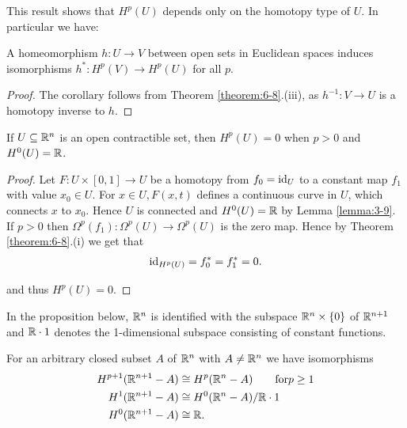 This result shows that $H^p(U)$ depends only on the homotopy type of $U$. In
particular we have:

\begin{corollary}\label{corollary:6-9}
A homeomorphism $h:U\to V$ between open sets in Euclidean spaces induces isomorphisms $h^*:H^p(V)\to H^p(U)$ for
all $p$.
\end{corollary}

\begin{proof}
  The corollary follows from Theorem \ref{theorem:6-8}.(iii), as $h^{-1}:V\to U$ is a
homotopy inverse to $h$.
\end{proof}

\begin{corollary}\label{corollary:6-10}
If $U\subseteq {\ensuremath{\mathbb{R}}}^n$ is an open contractible set, then $H^p(U) = 0$ when
$p > 0$ and $H^0(U) = {\mathbb{R}}$.
\end{corollary}


\begin{proof}
Let $F:U\times[0, 1]\to U$ be a homotopy from $f_0 =\operatorname{id}_U$ to a constant map
$f_1$ with value $x_0\in U$. For $x\in U, F(x, t)$ defines a continuous curve in $U$,
which connects $x$ to $x_0$. Hence $U$ is connected and $H^0(U) = {\mathbb{R}}$ by Lemma \ref{lemma:3-9}.
If $p > 0$ then $\Omega^p(f_1):\Omega^p(U)\to\Omega^p(U)$ is the zero map. Hence by Theorem
\ref{theorem:6-8}.(i) we get that
\begin{align*}
  \operatorname{id}_{H^p(U)} = f_0^* = f_1^* = 0.
\end{align*}

and thus $H^p(U) = 0$.
\end{proof}

In the proposition below, ${\mathbb{R}}^n$ is identified with the subspace ${\mathbb{R}}^n\times\{0\}$ of ${\mathbb{R}}^{n+1}$
and ${\mathbb{R}}\cdot 1$ denotes the 1-dimensional subspace consisting of constant functions.

\begin{proposition}\label{prop:6-11}
  For an arbitrary closed subset $A$ of ${\mathbb{R}}^n$ with $A\neq{\ensuremath{\mathbb{R}}}^n$ we have isomorphisms
  \begin{align*}
    H^{p+1}({\mathbb{R}}^{n+1} - A) &\cong H^p({\mathbb{R}}^n - A)\qquad\text{for} p\ge 1 \\
    H^1({\mathbb{R}}^{n+1} - A) &\cong H^0({\mathbb{R}}^n - A)/{\mathbb{R}}\cdot 1 \\
    H^0({\mathbb{R}}^{n+1} - A) &\cong {\ensuremath{\mathbb{R}}}.
  \end{align*}
\end{proposition}



